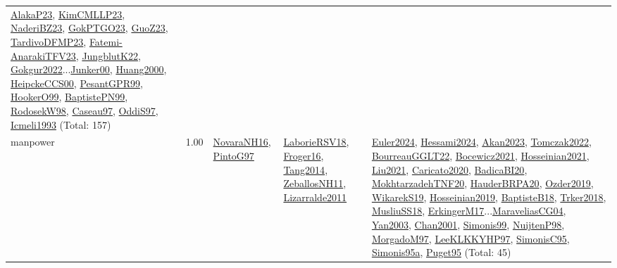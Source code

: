 {\begin{longtable}{p{3cm}r>{\raggedright\arraybackslash}p{6cm}>{\raggedright\arraybackslash}p{6cm}>{\raggedright\arraybackslash}p{8cm}}
\hyperref[detail:AlakaP23]{AlakaP23}, \hyperref[detail:KimCMLLP23]{KimCMLLP23}, \hyperref[detail:NaderiBZ23]{NaderiBZ23}, \hyperref[detail:GokPTGO23]{GokPTGO23}, \hyperref[detail:GuoZ23]{GuoZ23}, \hyperref[detail:TardivoDFMP23]{TardivoDFMP23}, \hyperref[detail:Fatemi-AnarakiTFV23]{Fatemi-AnarakiTFV23}, \hyperref[detail:JungblutK22]{JungblutK22}, \hyperref[detail:Gokgur2022]{Gokgur2022}...\hyperref[detail:Junker00]{Junker00}, \hyperref[detail:Huang2000]{Huang2000}, \hyperref[detail:HeipckeCCS00]{HeipckeCCS00}, \hyperref[detail:PesantGPR99]{PesantGPR99}, \hyperref[detail:HookerO99]{HookerO99}, \hyperref[detail:BaptistePN99]{BaptistePN99}, \hyperref[detail:RodosekW98]{RodosekW98}, \hyperref[detail:Caseau97]{Caseau97}, \hyperref[detail:OddiS97]{OddiS97}, \hyperref[detail:Icmeli1993]{Icmeli1993} (Total: 157)\\
\index{manpower}\index{Concepts!manpower}manpower &  1.00 & \hyperref[detail:NovaraNH16]{NovaraNH16}, \hyperref[detail:PintoG97]{PintoG97} & \hyperref[detail:LaborieRSV18]{LaborieRSV18}, \hyperref[detail:Froger16]{Froger16}, \hyperref[detail:Tang2014]{Tang2014}, \hyperref[detail:ZeballosNH11]{ZeballosNH11}, \hyperref[detail:Lizarralde2011]{Lizarralde2011} & \hyperref[detail:Euler2024]{Euler2024}, \hyperref[detail:Hessami2024]{Hessami2024}, \hyperref[detail:Akan2023]{Akan2023}, \hyperref[detail:Tomczak2022]{Tomczak2022}, \hyperref[detail:BourreauGGLT22]{BourreauGGLT22}, \hyperref[detail:Bocewicz2021]{Bocewicz2021}, \hyperref[detail:Hosseinian2021]{Hosseinian2021}, \hyperref[detail:Liu2021]{Liu2021}, \hyperref[detail:Caricato2020]{Caricato2020}, \hyperref[detail:BadicaBI20]{BadicaBI20}, \hyperref[detail:MokhtarzadehTNF20]{MokhtarzadehTNF20}, \hyperref[detail:HauderBRPA20]{HauderBRPA20}, \hyperref[detail:Ozder2019]{Ozder2019}, \hyperref[detail:WikarekS19]{WikarekS19}, \hyperref[detail:Hosseinian2019]{Hosseinian2019}, \hyperref[detail:BaptisteB18]{BaptisteB18}, \hyperref[detail:Trker2018]{Trker2018}, \hyperref[detail:MusliuSS18]{MusliuSS18}, \hyperref[detail:ErkingerM17]{ErkingerM17}...\hyperref[detail:MaraveliasCG04]{MaraveliasCG04}, \hyperref[detail:Yan2003]{Yan2003}, \hyperref[detail:Chan2001]{Chan2001}, \hyperref[detail:Simonis99]{Simonis99}, \hyperref[detail:NuijtenP98]{NuijtenP98}, \hyperref[detail:MorgadoM97]{MorgadoM97}, \hyperref[detail:LeeKLKKYHP97]{LeeKLKKYHP97}, \hyperref[detail:SimonisC95]{SimonisC95}, \hyperref[detail:Simonis95a]{Simonis95a}, \hyperref[detail:Puget95]{Puget95} (Total: 45)\\

\end{longtable}}
